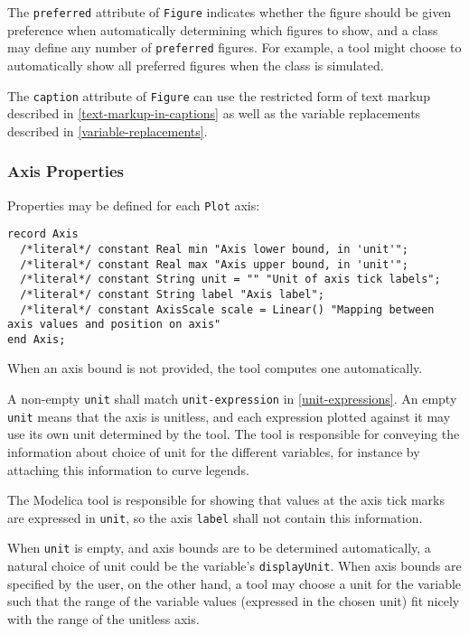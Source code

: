 The \lstinline!preferred! attribute of \lstinline!Figure! indicates whether the figure should be given preference when automatically determining which figures to show, and a class may define any number of \lstinline!preferred! figures.
For example, a tool might choose to automatically show all preferred figures when the class is simulated.

The \lstinline!caption! attribute of \lstinline!Figure! can use the restricted form of text markup described in \cref{text-markup-in-captions} as well as the variable replacements described in \cref{variable-replacements}.

\subsubsection{Axis Properties}\label{axis-properties}

Properties may be defined for each \lstinline!Plot! axis:
\begin{lstlisting}[language=modelica]
record Axis
  /*literal*/ constant Real min "Axis lower bound, in 'unit'";
  /*literal*/ constant Real max "Axis upper bound, in 'unit'";
  /*literal*/ constant String unit = "" "Unit of axis tick labels";
  /*literal*/ constant String label "Axis label";
  /*literal*/ constant AxisScale scale = Linear() "Mapping between axis values and position on axis"
end Axis;
\end{lstlisting}

When an axis bound is not provided, the tool computes one automatically.

A non-empty \lstinline!unit! shall match \lstinline[language=grammar]!unit-expression! in \cref{unit-expressions}.
An empty \lstinline!unit! means that the axis is unitless, and each expression plotted against it may use its own unit determined by the tool.
The tool is responsible for conveying the information about choice of unit for the different variables, for instance by attaching this information to curve legends.

The Modelica tool is responsible for showing that values at the axis tick marks are expressed in \lstinline!unit!, so the axis \lstinline!label! shall not contain this information.

\begin{nonnormative}
When \lstinline!unit! is empty, and axis bounds are to be determined automatically, a natural choice of unit could be the variable's \lstinline!displayUnit!.
When axis bounds are specified by the user, on the other hand, a tool may choose a unit for the variable such that the range of the variable values (expressed in the chosen unit) fit nicely with the range of the unitless axis.
\end{nonnormative}


